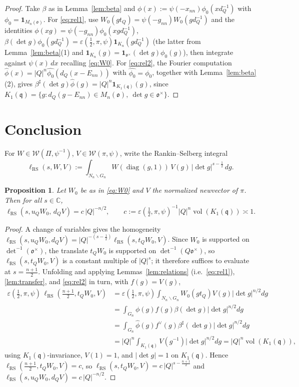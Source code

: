 \documentclass[11pt]{article}
\newcommand{\oo}{\mathfrak{o}}
\newcommand{\qq}{\mathfrak{q}}
\newcommand{\C}{\mathbb{C}}
\newcommand{\Mn}{M_n}
\newcommand{\W}{\mathcal{W}}
\newcommand{\vol}{\operatorname{vol}}
\newcommand{\diag}{\operatorname{diag}}
\newcommand{\lRS}{\ell_{\mathrm{RS}}}
\newtheorem{proposition}{Proposition}
\begin{document}
\begin{proof}
Take $\beta$ as in Lemma~\ref{lem:beta} and
$\phi(x):=\psi(-x_{nn})\phi_0(xd_Q^{-1})$ with $\phi_0=\mathbf 1_{\Mn(\oo)}$. For
\eqref{eq:rel1}, use $W_0(gt_Q)=\psi(-g_{nn})W_0(gd_Q^{-1})$ and the identities
$\phi(xg)=\psi(-g_{nn})\phi_0(xgd_Q^{-1})$,
$\beta(\det g)\phi_0(gd_Q^{-1})=\varepsilon(\tfrac12,\pi,\psi)\mathbf 1_{K_n}(gd_Q^{-1})$
(the latter from Lemma~\ref{lem:beta}(1) and
$\mathbf 1_{K_n}(g)=\mathbf 1_{\oo^\times}(\det g)\phi_0(g)$), then integrate
against $\psi(x)\,dx$ recalling \eqref{eq:W0}. For \eqref{eq:rel2}, the Fourier
computation $\widehat\phi(x)=|Q|^n\widehat{\phi_0}(d_Q(x-E_{nn}))$ with
$\widehat{\phi_0}=\phi_0$, together with Lemma~\ref{lem:beta}(2), gives
$\beta^\sharp(\det g)\widehat\phi(g)=|Q|^n\mathbf 1_{K_1(\qq)}(g)$, since
$K_1(\qq)=\{g:d_Q(g-E_{nn})\in\Mn(\oo),\ \det g\in\oo^\times\}$.
\end{proof}

\section*{Conclusion}

For $W\in\W(\Pi,\psi^{-1})$, $V\in\W(\pi,\psi)$, write the Rankin--Selberg
integral
\[
\lRS(s,W,V):=\int_{N_n\backslash G_n}W(\diag(g,1))\,V(g)\,|\det g|^{s-\frac12}\,dg.
\]

\begin{proposition}\label{prop:final}
Let $W_0$ be as in \eqref{eq:W0} and $V$ the normalized newvector of $\pi$. Then
for all $s\in\C$,
\[
\lRS(s,u_Q W_0,\,d_Q V)=c\,|Q|^{-n/2},\qquad
c:=\varepsilon(\tfrac12,\pi,\psi)^{-1}|Q|^n\vol(K_1(\qq))\asymp 1.
\]
\end{proposition}

\begin{proof}
A change of variables gives the homogeneity
$\lRS(s,u_Q W_0,d_Q V)=|Q|^{-(s-\frac12)}\lRS(s,t_Q W_0,V)$. Since $W_0$ is
supported on $\det^{-1}(\oo^\times)$, the translate $t_Q W_0$ is supported on
$\det^{-1}(Q\oo^\times)$, so $\lRS(s,t_Q W_0,V)$ is a constant multiple of
$|Q|^s$; it therefore suffices to evaluate at $s=\tfrac{n+1}{2}$. Unfolding and
applying Lemmas~\ref{lem:relations} (i.e.\ \eqref{eq:rel1}), \ref{lem:transfer},
and \eqref{eq:rel2} in turn, with $f(g)=V(g)$,
\begin{align*}
\varepsilon(\tfrac12,\pi,\psi)\,\lRS(\tfrac{n+1}{2},t_Q W_0,V)
&=\varepsilon(\tfrac12,\pi,\psi)\!\int_{N_n\backslash G_n}\!W_0(gt_Q)V(g)|\det g|^{n/2}dg\\
&=\int_{G_n}\phi(g)f(g)\beta(\det g)|\det g|^{n/2}dg\\
&=\int_{G_n}\widehat\phi(g)f^\vee(g)\beta^\sharp(\det g)|\det g|^{n/2}dg\\
&=|Q|^n\!\int_{K_1(\qq)}\!V(g^{-1})|\det g|^{n/2}dg
=|Q|^n\vol(K_1(\qq)),
\end{align*}
using $K_1(\qq)$-invariance, $V(1)=1$, and $|\det g|=1$ on $K_1(\qq)$. Hence
$\lRS(\tfrac{n+1}{2},t_Q W_0,V)=c$, so $\lRS(s,t_Q W_0,V)=c\,|Q|^{s-\frac{n+1}{2}}$
and $\lRS(s,u_Q W_0,d_Q V)=c\,|Q|^{-n/2}$.
\end{proof}
\end{document}
